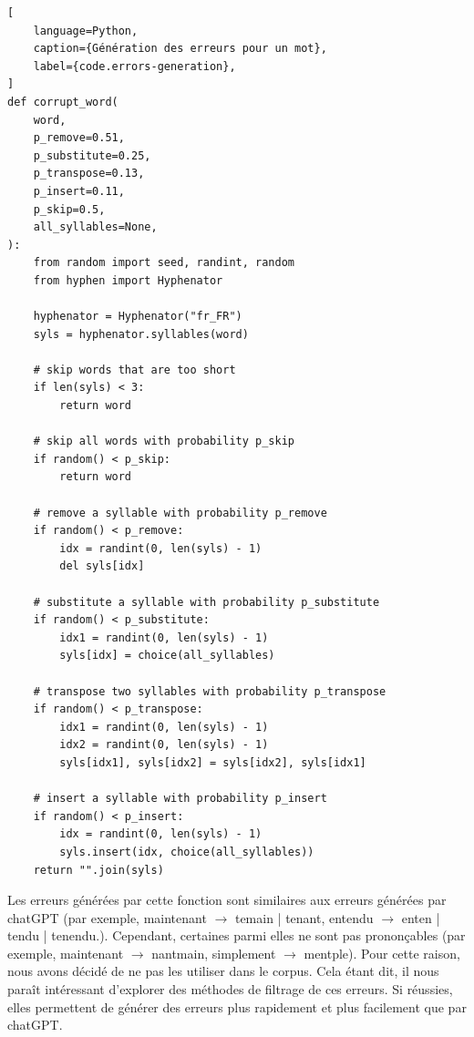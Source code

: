 \begin{lstlisting}[
    language=Python,
    caption={Génération des erreurs pour un mot},
    label={code.errors-generation},
]
def corrupt_word(
    word,
    p_remove=0.51,
    p_substitute=0.25,
    p_transpose=0.13,
    p_insert=0.11,
    p_skip=0.5,
    all_syllables=None,
):
    from random import seed, randint, random
    from hyphen import Hyphenator

    hyphenator = Hyphenator("fr_FR")
    syls = hyphenator.syllables(word)

    # skip words that are too short
    if len(syls) < 3:
        return word

    # skip all words with probability p_skip
    if random() < p_skip:
        return word

    # remove a syllable with probability p_remove
    if random() < p_remove:
        idx = randint(0, len(syls) - 1)
        del syls[idx]

    # substitute a syllable with probability p_substitute
    if random() < p_substitute:
        idx1 = randint(0, len(syls) - 1)
        syls[idx] = choice(all_syllables)

    # transpose two syllables with probability p_transpose
    if random() < p_transpose:
        idx1 = randint(0, len(syls) - 1)
        idx2 = randint(0, len(syls) - 1)
        syls[idx1], syls[idx2] = syls[idx2], syls[idx1]

    # insert a syllable with probability p_insert
    if random() < p_insert:
        idx = randint(0, len(syls) - 1)
        syls.insert(idx, choice(all_syllables))
    return "".join(syls)
\end{lstlisting}

Les erreurs générées par cette fonction sont similaires aux erreurs générées par chatGPT
(par exemple, maintenant \(\to\) temain | tenant, entendu \(\to\) enten | tendu | tenendu.).
Cependant, certaines parmi elles ne sont pas prononçables
(par exemple, maintenant \(\to\) nantmain, simplement \(\to\) mentple).
Pour cette raison, nous avons décidé de ne pas les utiliser dans le corpus.
Cela étant dit, il nous paraît intéressant d'explorer des méthodes de filtrage de ces erreurs.
Si réussies, elles permettent de générer des erreurs plus rapidement et plus facilement que par chatGPT\@.
